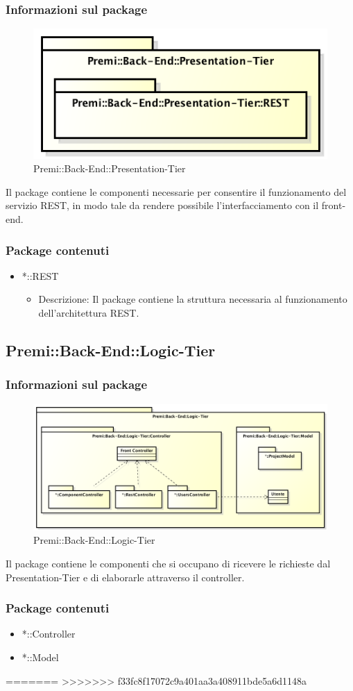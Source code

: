 	\subsubsection{Informazioni sul package}
		\begin{figure}[h]
			\centering
			\includegraphics[width=0.7\linewidth]{img/back-end-package_presentation-tier}
			\caption[Premi::Back-End::Presentation-Tier]{Premi::Back-End::Presentation-Tier}
		\end{figure}
		Il package contiene le componenti necessarie per consentire il funzionamento del servizio REST, in modo tale da rendere possibile l'interfacciamento con il front-end.
		
	\subsubsection{Package contenuti}
		\begin{itemize}
			\item *::REST
			\begin{itemize}
				\item Descrizione: Il package contiene la struttura necessaria al funzionamento dell'architettura REST.
			\end{itemize}
		\end{itemize}
		
		
\subsection{Premi::Back-End::Logic-Tier}
	\subsubsection{Informazioni sul package}
	\begin{figure}[h]
		\centering
		\includegraphics[width=0.7\linewidth]{img/back-end-package_logic-tier}
		\caption[Premi::Back-End::Logic-Tier]{Premi::Back-End::Logic-Tier}
	\end{figure}
	Il package contiene le componenti che si occupano di ricevere le richieste dal Presentation-Tier e di elaborarle attraverso il controller.
	
	\subsubsection{Package contenuti}
	\begin{itemize}
		\item *::Controller
		\item *::Model
	\end{itemize}
=======
>>>>>>> f33fc8f17072c9a401aa3a408911bde5a6d1148a
